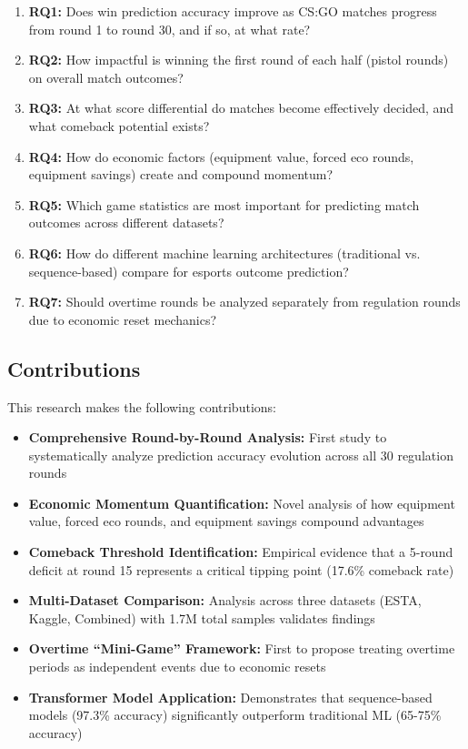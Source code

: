 \documentclass[11pt]{article}
\begin{document}
\begin{enumerate}
    \item \textbf{RQ1:} Does win prediction accuracy improve as CS:GO matches progress from round 1 to round 30, and if so, at what rate?
    \item \textbf{RQ2:} How impactful is winning the first round of each half (pistol rounds) on overall match outcomes?
    \item \textbf{RQ3:} At what score differential do matches become effectively decided, and what comeback potential exists?
    \item \textbf{RQ4:} How do economic factors (equipment value, forced eco rounds, equipment savings) create and compound momentum?
    \item \textbf{RQ5:} Which game statistics are most important for predicting match outcomes across different datasets?
    \item \textbf{RQ6:} How do different machine learning architectures (traditional vs. sequence-based) compare for esports outcome prediction?
    \item \textbf{RQ7:} Should overtime rounds be analyzed separately from regulation rounds due to economic reset mechanics?
\end{enumerate}

\subsection{Contributions}

This research makes the following contributions:

\begin{itemize}
    \item \textbf{Comprehensive Round-by-Round Analysis:} First study to systematically analyze prediction accuracy evolution across all 30 regulation rounds
    \item \textbf{Economic Momentum Quantification:} Novel analysis of how equipment value, forced eco rounds, and equipment savings compound advantages
    \item \textbf{Comeback Threshold Identification:} Empirical evidence that a 5-round deficit at round 15 represents a critical tipping point (17.6\% comeback rate)
    \item \textbf{Multi-Dataset Comparison:} Analysis across three datasets (ESTA, Kaggle, Combined) with 1.7M total samples validates findings
    \item \textbf{Overtime ``Mini-Game'' Framework:} First to propose treating overtime periods as independent events due to economic resets
    \item \textbf{Transformer Model Application:} Demonstrates that sequence-based models (97.3\% accuracy) significantly outperform traditional ML (65-75\% accuracy)
\end{itemize}
\end{document}
